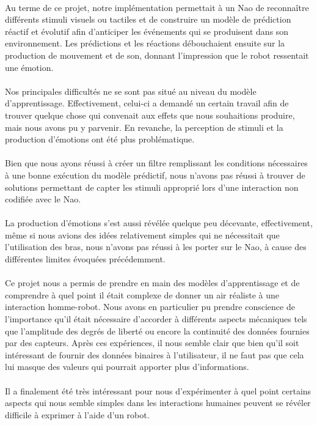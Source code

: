\paragraph{}
Au terme de ce projet, notre implémentation permettait à un Nao de
reconnaître différents stimuli visuels ou tactiles et de construire un
modèle de prédiction réactif et évolutif afin d'anticiper les événements qui
se produisent dans son environnement. Les prédictions et les réactions
débouchaient ensuite sur la production de mouvement et de son, donnant
l'impression que le robot ressentait une émotion.

\paragraph{}
Nos principales difficultés ne se sont pas situé au niveau du modèle
d'apprentissage. Effectivement, celui-ci a demandé un certain travail afin
de trouver quelque chose qui convenait aux effets que nous souhaitions
produire, mais nous avons pu y parvenir. En revanche, la perception de
stimuli et la production d'émotions ont été plus problématique.

\paragraph{}
Bien que nous ayons réussi à créer un filtre remplissant les conditions
nécessaires à une bonne exécution du modèle prédictif, nous n'avons pas
réussi à trouver de solutions permettant de capter les stimuli approprié
lors d'une interaction non codifiée avec le Nao.

\paragraph{}
La production d'émotions s'est aussi révélée quelque peu décevante,
effectivement, même si nous avions des idées relativement simples qui ne
nécessitait que l'utilisation des bras, nous n'avons pas réussi à les porter
sur le Nao, à cause des différentes limites évoquées précédemment.

\paragraph{}
Ce projet nous a permis de prendre en main des modèles d'apprentissage et
de comprendre à quel point il était complexe de donner un air réaliste à une
interaction homme-robot. Nous avons en particulier pu prendre conscience de
l'importance qu'il était nécessaire d'accorder à différents aspects
mécaniques tels que l'amplitude des degrés de liberté ou encore la
continuité des données fournies par des capteurs. Après ces expériences, il
nous semble clair que bien qu'il soit intéressant de fournir des données
binaires à l'utilisateur, il ne faut pas que cela lui masque des valeurs qui
pourrait apporter plus d'informations.

\paragraph{}
Il a finalement été très intéressant pour nous d'expérimenter à quel point
certains aspects qui nous semble simples dans les interactions humaines
peuvent se révéler difficile à exprimer à l'aide d'un robot.
